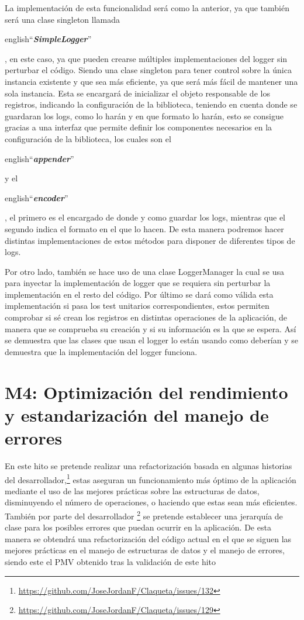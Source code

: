 La implementación de esta funcionalidad será como la anterior, ya que también será una clase singleton
\cite{DPatterns} llamada \begin{otherlanguage} {english}``\textit{\textbf{SimpleLogger}}''\end{otherlanguage}, 
en este caso, ya que pueden crearse múltiples implementaciones del logger sin perturbar el código. Siendo una clase 
singleton para tener control sobre la única instancia existente y que sea más eficiente, ya que será más fácil de 
mantener una sola instancia. Esta se encargará de inicializar el objeto responsable de los registros, indicando la 
configuración de la biblioteca, teniendo en cuenta donde se guardaran los logs, como lo harán y en que formato lo 
harán, esto se consigue gracias a una interfaz que permite definir los componentes necesarios en la configuración de 
la biblioteca, los cuales son el \begin{otherlanguage} {english}``\textit{\textbf{appender}}''\end{otherlanguage} y 
el \begin{otherlanguage} {english}``\textit{\textbf{encoder}}''\end{otherlanguage}, el primero es el encargado de 
donde y como guardar los logs, mientras que el segundo indica el formato en el que lo hacen. De esta manera podremos 
hacer distintas implementaciones de estos métodos para disponer de diferentes tipos de logs.

Por otro lado, también se hace uso de una clase LoggerManager la cual se usa para inyectar la implementación de 
logger que se requiera sin perturbar la implementación en el resto del código. Por último se dará como válida esta
implementación si pasa los test unitarios correspondientes, estos permiten comprobar si sé crean los registros en 
distintas operaciones de la aplicación, de manera que se comprueba su creación y si su información es la que se 
espera. Así se demuestra que las clases que usan el logger lo están usando como deberían y se demuestra que la 
implementación del logger funciona.

\section{M4: Optimización del rendimiento y estandarización del manejo de errores}

En este hito se pretende realizar una refactorización basada en algunas historias del 
desarrollador,\footnote{\url{https://github.com/JoseJordanF/Claqueta/issues/132}}
estas aseguran un funcionamiento más óptimo de la aplicación mediante el uso de las mejores prácticas sobre las 
estructuras de datos, disminuyendo el número de operaciones, o haciendo que estas sean más eficientes. También por 
parte del desarrollador \footnote{\url{https://github.com/JoseJordanF/Claqueta/issues/129}} se pretende establecer una 
jerarquía de clase para los posibles errores que puedan ocurrir en la aplicación. De esta manera se obtendrá una 
refactorización del código actual en el que se siguen las mejores prácticas en el manejo de estructuras de datos y el 
manejo de errores, siendo este el PMV obtenido tras la validación de este hito

